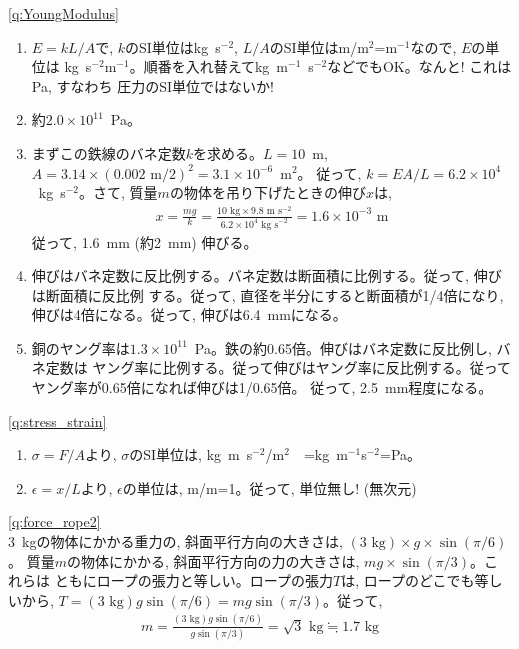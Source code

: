 \ref{q:YoungModulus}\\
\begin{enumerate}
\item $E=kL/A$で, $k$のSI単位はkg~s$^{-2}$, $L/A$のSI単位はm/m$^{2}$=m$^{-1}$なので, $E$の単位は
kg~s$^{-2}$m$^{-1}$。順番を入れ替えてkg~m$^{-1}$~s$^{-2}$などでもOK。なんと! これはPa, すなわち
圧力のSI単位ではないか!
\item 約$2.0\times10^{11}$~Pa。
\item まずこの鉄線のバネ定数$k$を求める。$L=10$~m, $A=3.14\times(0.002\text{ m}/2)^2=3.1\times10^{-6}$~m$^2$。
従って, $k=EA/L=6.2\times10^{4}$~kg~s$^{-2}$。さて, 質量$m$の物体を吊り下げたときの伸び$x$は, 
\begin{eqnarray*}x=\frac{mg}{k}=\frac{10\text{ kg}\times9.8\text{ m s}^{-2}}{6.2\times10^4\text{ kg s}^{-2}}=1.6\times10^{-3}\text{ m}\end{eqnarray*}
従って, 1.6~mm (約2~mm) 伸びる。
\item 伸びはバネ定数に反比例する。バネ定数は断面積に比例する。従って, 伸びは断面積に反比例
する。従って, 直径を半分にすると断面積が1/4倍になり, 伸びは4倍になる。従って, 伸びは6.4~mmになる。
\item 銅のヤング率は$1.3\times 10^{11}$~Pa。鉄の約0.65倍。伸びはバネ定数に反比例し, バネ定数は
ヤング率に比例する。従って伸びはヤング率に反比例する。従ってヤング率が0.65倍になれば伸びは1/0.65倍。
従って, 2.5~mm程度になる。
\end{enumerate}
\vspace{0.2cm}

%
\ref{q:stress_strain}
\begin{enumerate}
\item $\sigma=F/A$より, $\sigma$のSI単位は, kg~m~s$^{-2}$/m$^2$　=kg~m$^{-1}$s$^{-2}$=Pa。
\item $\epsilon=x/L$より, $\epsilon$の単位は, m/m=1。従って, 単位無し! (無次元)
\end{enumerate}
\vspace{0.2cm}

\ref{q:force_rope2}\\
3~kgの物体にかかる重力の, 斜面平行方向の大きさは, $(3\text{ kg})\times g\times \sin (\pi/6)$。
質量$m$の物体にかかる, 斜面平行方向の力の大きさは, $mg\times \sin (\pi/3)$。これらは
ともにロープの張力と等しい。ロープの張力$T$は, ロープのどこでも等しいから, 
$T=(3\text{ kg}) g \sin (\pi/6)=mg \sin (\pi/3)$。従って, 
\begin{eqnarray}
m=\frac{(3\text{ kg})g\sin(\pi/6)}{g\sin(\pi/3)}=\sqrt{3}\text{ kg}\fallingdotseq 1.7\text{ kg}
\end{eqnarray}
\mv

